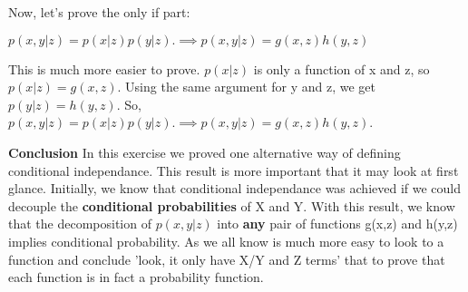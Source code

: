 \documentclass[a4paper,10pt]{book}
\begin{document}
Now, let's prove the only if part:

$p(x,y|z) = p(x|z)p(y|z). \implies p(x,y|z) = g(x,z)h(y,z)$

This is much more easier to prove. $p(x|z)$ is only a function
of x and z, so $p(x|z) = g(x,z)$. Using the same argument for y and z, we get 
$p(y|z) = h(y,z)$. So, $p(x,y|z) = p(x|z)p(y|z). \implies p(x,y|z) = g(x,z)h(y,z)$. 

\textbf{Conclusion}
In this exercise we proved one alternative way of defining conditional independance.
This result is more important that it may look at first glance. Initially, we know that
conditional independance was achieved if we could decouple the \textbf{ conditional probabilities}
of X and Y. With this result, we know that the decomposition of $p(x,y|z)$ into \textbf{any} pair of functions
g(x,z) and h(y,z) implies conditional probability. As we all know is much more easy to 
look to a function and conclude 'look, it only have X/Y and Z terms' that to prove that each
function is in fact a probability function.
\end{document}
